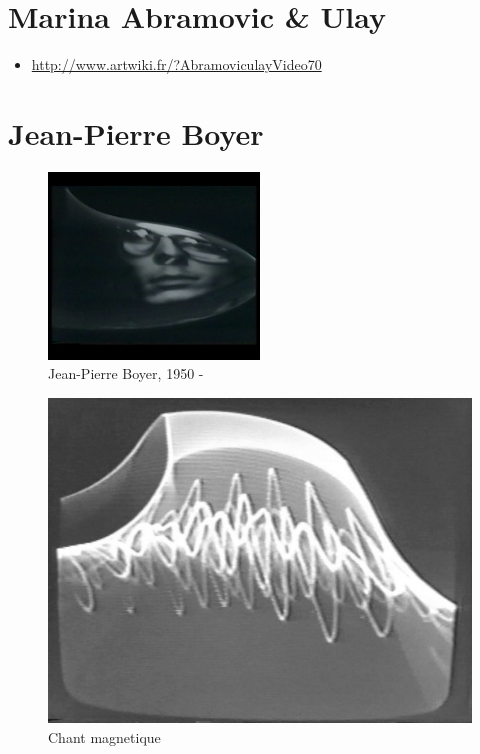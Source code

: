 \documentclass[
]{book}
\providecommand{\tightlist}{%
  \setlength{\itemsep}{0pt}\setlength{\parskip}{0pt}}
\begin{document}
\hypertarget{marina-abramovic-ulay}{%
\section{Marina Abramovic \& Ulay}\label{marina-abramovic-ulay}}

\begin{itemize}
\tightlist
\item
  \url{http://www.artwiki.fr/?AbramoviculayVideo70}
\end{itemize}

\hypertarget{jean-pierre-boyer}{%
\section{Jean-Pierre Boyer}\label{jean-pierre-boyer}}

\begin{figure}
\centering
\includegraphics[width=0.5\textwidth,height=\textheight]{medias/corpus/boyer/Portrait-e2288.jpg}
\caption{Jean-Pierre Boyer, 1950 -}
\end{figure}

\begin{figure}
\centering
\includegraphics{medias/corpus/boyer/Chant-magnetique.jpg}
\caption{Chant magnetique}
\end{figure}
\end{document}
